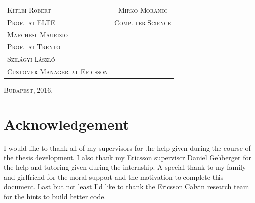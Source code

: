 \documentclass[a4paper,11pt]{report} %
\theoremstyle{change}
\theoremstyle{theoremstyle}
\def\myauthor{Mirko Morandi} %
\def\myacdsup{Kitlei Róbert} %
\def\myacdsuptit{Prof.}%
\def\myacdsupen{Marchese Maurizio} %
\def\myacdsupentit{Prof.}%
\def\myentryuni{Trento}%
\def\myindsup{Szilágyi László}%
\def\myindsuptit{Customer Manager}%
\def\myindcom{Ericsson}%
\def\currentyear{2016.}%
\begin{document}
\begin{titlepage}
\begin{tabular}{p{9cm}c}
{\fontsize{14}{10} \scshape \myacdsup} & {\fontsize{14}{10} \scshape \myauthor}\\

{\fontsize{12}{20} \scshape  \myacdsuptit \ at ELTE}\quad & {\fontsize{12}{20} \scshape Computer Science}\\

{\fontsize{14}{20} \scshape \myacdsupen}&\\

{\fontsize{12}{20} \scshape \myacdsupentit \ at \myentryuni}&\\

{\fontsize{14}{20} \scshape \myindsup}&\\

{\fontsize{12}{20} \scshape \myindsuptit \ at \myindcom}&\\
\end{tabular}

\vspace{3cm}
\begin{center}
{\large \scshape Budapest, \currentyear \\}
\end{center}
\end{titlepage}





\chapter*{Acknowledgement}
I would like to thank all of my supervisors for the help given during the course
of the thesis development. I also thank my Ericsson supervisor Daniel Gehberger for
the help and tutoring given during the internship. A special thank to my family and
girlfriend for the moral support and the motivation to complete this document. Last but
not least I'd like to thank the Ericsson Calvin research team for the hints to build
better code.

\tableofcontents















\end{document}

